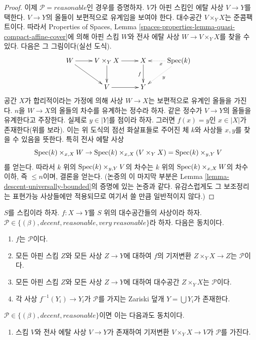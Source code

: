 \begin{proof}
\medskip\noindent
이제 $\mathcal{P} = reasonable$인 경우를 증명하자.
$V$가 아핀 스킴인 에탈 사상 $V \to Y$를 택한다.
$V \to Y$의 올들이 보편적으로 유계임을 보여야 한다.
대수공간 $V \times_Y X$는 준콤팩트이다. 따라서 Properties of Spaces,
Lemma \ref{spaces-properties-lemma-quasi-compact-affine-cover}에 의해
아핀 스킴 $W$와 전사 에탈 사상 $W \to V \times_Y X$를 찾을 수 있다.
다음은 그 그림이다(실선 도식).
$$
\xymatrix{
W \ar[r]  \ar[rd] &
V \times_Y X \ar[r] \ar[d] &
X \ar[d]_f & \Spec(k) \ar@{..>}[l]^x \ar@{..>}[ld]^y \\
 & V \ar[r] & Y
}
$$
공간 $X$가 합리적이라는 가정에 의해 사상 $W \to X$는 보편적으로
유계인 올들을 가진다. $n$을 $W \to X$의 올들의 차수를 유계하는
정수라 하자. 같은 정수가 $V \to Y$의 올들을 유계한다고 주장한다.
실제로 $y \in |Y|$를 점이라 하자.
그러면 $f(x) = y$인 $x \in |X|$가 존재한다(위를 보라).
이는 위 도식의 점선 화살표들로 주어진 체 $k$와 사상들 $x, y$를 찾을
수 있음을 뜻한다. 특히 전사 에탈 사상
$$
\mathop{\mathrm{Spec}}(k) \times_{x, X} W
\to
\mathop{\mathrm{Spec}}(k) \times_{x, X} (V \times_Y X) = \mathop{\mathrm{Spec}}(k) \times_{y, Y} V
$$
를 얻는다. 따라서 $k$ 위의 $\mathop{\mathrm{Spec}}(k) \times_{y, Y} V$의 차수는
$k$ 위의 $\mathop{\mathrm{Spec}}(k) \times_{x, X} W$의 차수 이하, 즉 $\leq n$이며,
결론을 얻는다. (논증의 이 마지막 부분은 Lemma
\ref{lemma-descent-universally-bounded}의 증명에 있는 논증과 같다.
유감스럽게도 그 보조정리는 표현가능 사상들에만 적용되므로 여기서 쓸
만큼 일반적이지 않다.)
\end{proof}

\begin{lemma}
\label{lemma-relative-conditions-local}
$S$를 스킴이라 하자.
$f : X \to Y$를 $S$ 위의 대수공간들의 사상이라 하자.
$\mathcal{P} \in \{(\beta), decent, reasonable, very\ reasonable\}$라 하자.
다음은 동치이다.
\begin{enumerate}
\item $f$는 $\mathcal{P}$이다.
\item 모든 아핀 스킴 $Z$와 모든 사상 $Z \to Y$에 대하여 $f$의
기저변환 $Z \times_Y X \to Z$는 $\mathcal{P}$이다.
\item 모든 아핀 스킴 $Z$와 모든 사상 $Z \to Y$에 대하여 대수공간
$Z \times_Y X$는 $\mathcal{P}$이다.
\item 각 사상 $f^{-1}(Y_i) \to Y_i$가 $\mathcal{P}$를 가지는
Zariski 덮개 $Y = \bigcup Y_i$가 존재한다.
\end{enumerate}
$\mathcal{P} \in \{(\beta), decent, reasonable\}$이면 이는 다음과도
동치이다.
\begin{enumerate}
\item[(5)] 스킴 $V$와 전사 에탈 사상 $V \to Y$가 존재하여 기저변환
$V \times_Y X \to V$가 $\mathcal{P}$를 가진다.
\end{enumerate}
\end{lemma}

